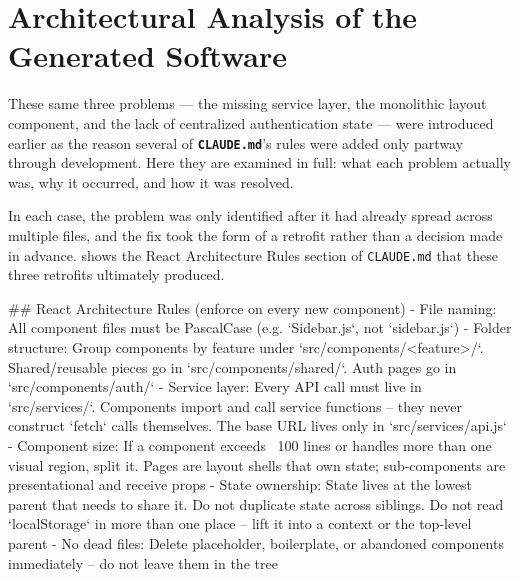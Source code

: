 \section{Architectural Analysis of the Generated Software}

These same three problems --- the missing service layer, the monolithic layout component, and the lack of centralized authentication state --- were introduced earlier as the reason several of \textbf{\texttt{CLAUDE.md}}'s rules were added only partway through development. Here they are examined in full: what each problem actually was, why it occurred, and how it was resolved.

In each case, the problem was only identified after it had already spread across multiple files, and the fix took the form of a retrofit rather than a decision made in advance.  shows the React Architecture Rules section of \texttt{CLAUDE.md} that these three retrofits ultimately produced.

\begin{listing}[H]
\begin{center}
\begin{promptbox}
## React Architecture Rules (enforce on every new component)
- File naming: All component files must be PascalCase (e.g. `Sidebar.js`, not `sidebar.js`)
- Folder structure: Group components by feature under `src/components/<feature>/`. Shared/reusable pieces go in `src/components/shared/`. Auth pages go in `src/components/auth/`
- Service layer: Every API call must live in `src/services/`. Components import and call service functions -- they never construct `fetch` calls themselves. The base URL lives only in `src/services/api.js`
- Component size: If a component exceeds ~100 lines or handles more than one visual region, split it. Pages are layout shells that own state; sub-components are presentational and receive props
- State ownership: State lives at the lowest parent that needs to share it. Do not duplicate state across siblings. Do not read `localStorage` in more than one place -- lift it into a context or the top-level parent
- No dead files: Delete placeholder, boilerplate, or abandoned components immediately -- do not leave them in the tree
\end{promptbox}
\end{center}
\caption{React Architecture Rules section of \texttt{CLAUDE.md}, added in response to the three retrofits discussed in this section.}
\label{lst:react-architecture-rules}
\end{listing}

